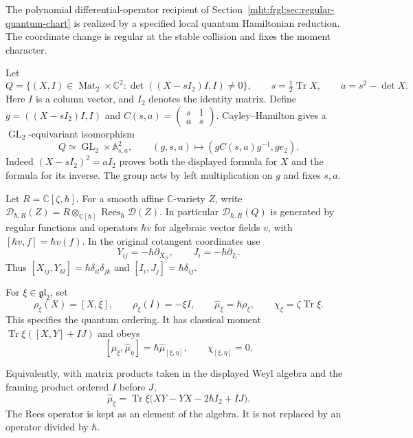 The polynomial differential-operator recipient of
Section~\ref{mht:frgl:sec:regular-quantum-chart} is realized by a specified
local quantum Hamiltonian reduction.  The coordinate change is
regular at the stable collision and fixes the moment character.

Let
\[
 Q=\{(X,I)\in\operatorname{Mat}_2\times\mathbb C^2:
          \det((X-sI_2)I,I)\ne0\},\qquad s=\tfrac12\operatorname{Tr}X,
 \qquad a=s^2-\det X.
\]
Here $I$ is a column vector, and $I_2$ denotes the identity matrix.
Define $g=((X-sI_2)I,I)$ and
$C(s,a)=\left(\begin{smallmatrix}s&1\\a&s\end{smallmatrix}\right)$.
Cayley--Hamilton gives a $\operatorname{GL}_2$-equivariant isomorphism
\begin{equation}\label{mht:frgl:eq:cyclic-base-trivialization}
 Q\simeq \operatorname{GL}_2\times\mathbb A^2_{s,a},\qquad
 (g,s,a)\longmapsto (gC(s,a)g^{-1},ge_2).
\end{equation}
Indeed $(X-sI_2)^2=aI_2$ proves both the displayed formula for
$X$ and the formula for its inverse.  The group acts by left
multiplication on $g$ and fixes $s,a$.

Let $R=\mathbb C[\zeta,\hbar]$.  For a smooth affine
$\mathbb C$-variety $Z$, write
$\mathscr D_{\hbar,R}(Z)=
 R\otimes_{\mathbb C[\hbar]}\operatorname{Rees}_\hbar\mathscr D(Z)$.
In particular $\mathscr D_{\hbar,R}(Q)$ is generated by regular
functions and operators $\hbar v$ for algebraic vector fields
$v$, with $[\hbar v,f]=\hbar v(f)$.
In the original cotangent coordinates use
\[
 Y_{ij}=-\hbar\partial_{X_{ji}},\qquad
 J_i=-\hbar\partial_{I_i}.
\]
Thus $[X_{ij},Y_{kl}]=\hbar\delta_{il}\delta_{jk}$ and
$[I_i,J_j]=\hbar\delta_{ij}$.

For $\xi\in\mathfrak{gl}_2$, set
\[
 \rho_\xi(X)=[X,\xi],\qquad \rho_\xi(I)=-\xi I,
 \qquad \widehat\mu_\xi=\hbar\rho_\xi,
 \qquad \chi_\xi=\zeta\operatorname{Tr}\xi.
\]
This specifies the quantum ordering.  It has classical moment
$\operatorname{Tr}\xi([X,Y]+IJ)$ and obeys
\[
 [\widehat\mu_\xi,\widehat\mu_\eta]
   =\hbar\widehat\mu_{[\xi,\eta]},\qquad
 \chi_{[\xi,\eta]}=0.
\]

Equivalently, with matrix products taken in the displayed
Weyl algebra and the framing product ordered $I$ before $J$,
\[
 \widehat\mu_\xi=
 \operatorname{Tr}\xi\bigl(XY-YX-2\hbar I_2+IJ\bigr).
\]
The Rees operator is kept as an element of the algebra. It is
not replaced by an operator divided by $\hbar$.

